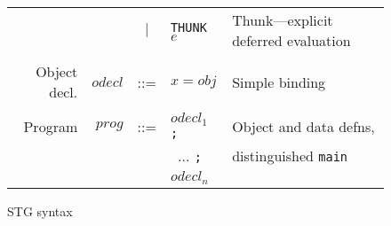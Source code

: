 \documentclass[11pt]{article}
\begin{document}
\begin{figure}
\begin{tabular}{r r c l l}
             &                & $|$ &\texttt{THUNK} $e$                            & Thunk---explicit deferred evaluation \\
\\
Object decl. & $\mathit{odecl}$ & ::=  & $x = \mathit{obj}$                           & Simple binding \\
\\
Program      & $\mathit{prog}$ & ::= & $\mathit{odecl}_1$ \texttt{;}            & Object and data defns, \\
             &                 &     & \texttt{ } $\dots$ \texttt{;}                & distinguished \texttt{main}\\
             &                 &     & $\mathit{odecl}_n$ & 

\end{tabular}
\caption{STG syntax}
\label{fig:STGsyntax}
\end{figure}
\end{document}
